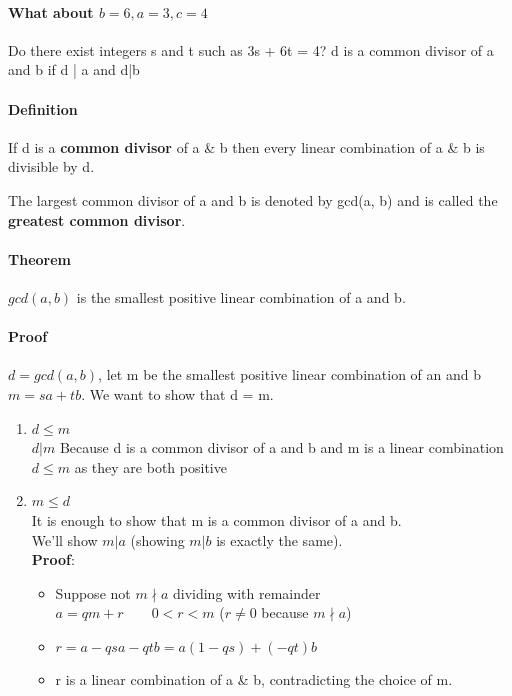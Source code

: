 \documentclass[9pt, letterpaper, oneside]{article}
\begin{document}
\paragraph{What about $b=6, a=3, c=4$} 
Do there exist integers s and t such as 3s + 6t = 4?
d is a common divisor of a and b if d | a and d|b\\
\paragraph{Definition}
    If d is a \textbf{common divisor} of a \& b then every linear combination of a \& b is divisible by d.

The largest common divisor of a and b is denoted by gcd(a, b) and is called the \textbf{greatest common divisor}.

\paragraph{Theorem}
    $gcd(a, b)$ is the smallest positive linear combination of a and b. 
\paragraph{Proof}
    $d = gcd(a,b)$, let m be the smallest positive linear combination of an and b \\
    $m = sa + tb$. We want to show that d = m.
    \begin{enumerate}
        \item $d \leq m$\\
            $d | m$ Because d is a common divisor of a and b and m is a linear combination\\
            $d \leq m$ as they are both positive
        \item $m \leq d$\\
            It is enough to show that m is a common divisor of a and b.\\
            We'll show $m | a$ (showing $m | b$ is exactly the same).\\
            \textbf{Proof}: 
            \begin{itemize}
                \item Suppose not ${m \nmid a}$ dividing with remainder \\
                    $a = qm + r \qquad 0 < r <m$ ($r \neq 0$ because $m \nmid a$) %
                \item $r = a - qsa - qtb = a(1-qs) + (-qt)b$ \\
                \item r is a linear combination of a \& b, contradicting the choice of m.   
            \end{itemize}
\end{enumerate}
\end{document}
